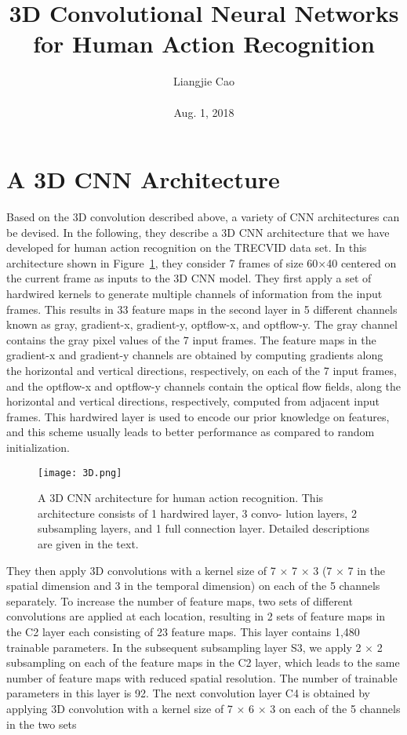 \documentclass[10pt,twocolumn,letterpaper]{article}
\begin{document}
\title{\textbf{3D Convolutional Neural Networks for Human Action Recognition}}
\author{Liangjie Cao\\\\ Aug. 1, 2018}
\maketitle
\section{A 3D CNN Architecture}
Based on the 3D convolution described above, a variety of CNN architectures can be devised. In the following, they describe a 3D CNN architecture that we have developed for human action recognition on the TRECVID
data set. In this architecture shown in Figure~\ref{Figure1}, they consider 7 frames of size 60×40 centered on the current frame as inputs to the 3D CNN model. They first apply a set of hardwired kernels to generate multiple channels of information from the input frames. This results in 33 feature maps in the second layer in 5 different channels known as gray, gradient-x, gradient-y, optflow-x, and optflow-y. The gray channel contains the gray
pixel values of the 7 input frames. The feature maps in the gradient-x and gradient-y channels are obtained by computing gradients along the horizontal and vertical directions, respectively, on each of the 7 input
frames, and the optflow-x and optflow-y channels contain the optical flow fields, along the horizontal and vertical directions, respectively, computed from adjacent input frames. This hardwired layer is used to encode our prior knowledge on features, and this scheme usually leads to better performance as compared to random initialization.
  \begin{figure}[!htb]
  	\centering
  	\texttt{[image: 3D.png]}\\
  	\caption{A 3D CNN architecture for human action recognition. This architecture consists of 1 hardwired layer, 3 convo-
  		lution layers, 2 subsampling layers, and 1 full connection layer. Detailed descriptions are given in the text.}\label{Figure1} 
  \end{figure}
\par They then apply 3D convolutions with a kernel size of 7 $\times$ 7 $\times$ 3 (7 $\times$ 7 in the spatial dimension and 3 in the temporal dimension) on each of the 5 channels separately. To increase the number of feature maps, two sets of different convolutions are applied at each location, resulting in 2 sets of feature maps in the C2 layer each consisting of 23 feature maps. This layer contains 1,480 trainable parameters. In the subsequent subsampling layer S3, we apply 2 $\times$ 2 subsampling on each of the feature maps in the C2 layer, which leads to the same number of feature maps with reduced spatial resolution. The number of trainable parameters in this layer is 92. The next convolution layer C4 is obtained by applying 3D convolution with a kernel size of 7 $\times$ 6 $\times$ 3 on each of the 5 channels in the two sets
\end{document}
